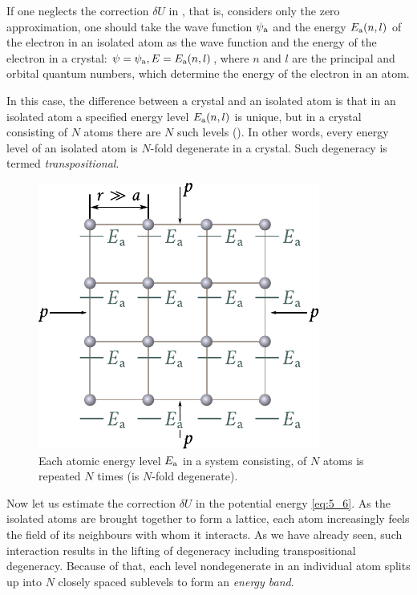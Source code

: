 If one neglects the correction $\delta{U}$ in , that is, considers only the zero approximation, one should take the wave function $\psi_{\text{a}}$ and the energy $E_{\text{a}}(n,l)$ of the electron in an isolated atom as the wave function and the energy of the electron in a crystal: $\psi=\psi_{\text{a}}, E=E_{\text{a}}(n,l)$, where $n$ and $l$ are the principal and orbital quantum numbers, which determine the energy of the electron in an atom.

In this case, the difference between a crystal and an isolated atom is that in an isolated atom a specified energy level $E_{\text{a}}(n,l)$ is unique, but in a crystal consisting of $N$ atoms there are $N$ such levels (). In other words, every energy level of an isolated atom is $N$-fold degenerate in a crystal. Such degeneracy is termed \textit{transpositional}.

\begin{figure}[t]
	\begin{center}
		\includegraphics[scale=1]{figures/ch_05/fig_5_5.pdf}
		\caption[]{Each atomic energy level $E_{\text{a}}$ in a system consisting, of $N$ atoms is repeated $N$ times (is $N$-fold degenerate).}
		\label{fig:5_5}
	\end{center}
	\vspace{-0.7cm}
\end{figure}

Now let us estimate the correction $\delta{U}$ in the potential energy \eqref{eq:5_6}. As the isolated atoms are brought together to form a lattice, each atom increasingly feels the field of its neighbours with whom it interacts. As we have already seen, such interaction results in the lifting of degeneracy including transpositional degeneracy. Because of that, each level nondegenerate in an individual atom splits up into $N$ closely spaced sublevels to form an \textit{energy band}.

